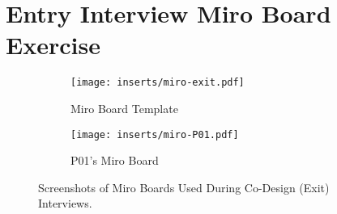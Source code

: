 \section{Entry Interview Miro Board Exercise}
\label{ref:miro}

\begin{figure*}[!h]
  \centering
  \begin{subfigure}{\textwidth}
    \centering
    \texttt{[image: inserts/miro-exit.pdf]}
    \caption{Miro Board Template}
  \end{subfigure}
  
  \vspace{1em}

  \begin{subfigure}{\textwidth}
    \centering
    \texttt{[image: inserts/miro-P01.pdf]}
    \caption{P01's Miro Board}
  \end{subfigure}

\caption{Screenshots of Miro Boards Used During Co-Design (Exit) Interviews.}
\end{figure*}
